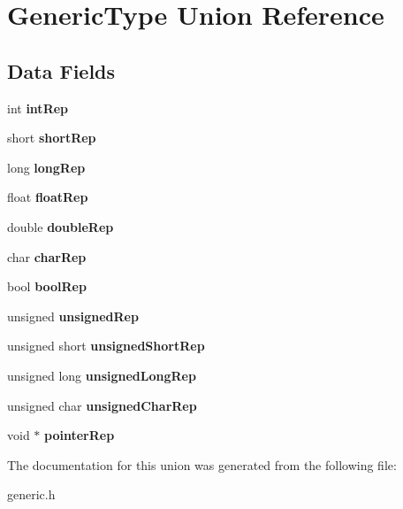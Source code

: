 \hypertarget{union_generic_type}{}\section{Generic\+Type Union Reference}
\label{union_generic_type}
\subsection*{Data Fields}
\begin{DoxyCompactItemize}
\item 
\hypertarget{union_generic_type_a89fd1c368975db376a6cdd770d587900}{}\label{union_generic_type_a89fd1c368975db376a6cdd770d587900} 
int {\bfseries int\+Rep}
\item 
\hypertarget{union_generic_type_ac950c4ff66d782e32b4e5cf8d6565fae}{}\label{union_generic_type_ac950c4ff66d782e32b4e5cf8d6565fae} 
short {\bfseries short\+Rep}
\item 
\hypertarget{union_generic_type_a29e82c715ea6fbe158eebca897716806}{}\label{union_generic_type_a29e82c715ea6fbe158eebca897716806} 
long {\bfseries long\+Rep}
\item 
\hypertarget{union_generic_type_aee93dd7c0fc502a552aacc321d5d5743}{}\label{union_generic_type_aee93dd7c0fc502a552aacc321d5d5743} 
float {\bfseries float\+Rep}
\item 
\hypertarget{union_generic_type_a5fe743464c3fec1fb7a724f06ba705b2}{}\label{union_generic_type_a5fe743464c3fec1fb7a724f06ba705b2} 
double {\bfseries double\+Rep}
\item 
\hypertarget{union_generic_type_a1eec0595c8a080d2ce3a1bf2b62895cb}{}\label{union_generic_type_a1eec0595c8a080d2ce3a1bf2b62895cb} 
char {\bfseries char\+Rep}
\item 
\hypertarget{union_generic_type_acd5d54743ad441d2d1012e2c7a993fae}{}\label{union_generic_type_acd5d54743ad441d2d1012e2c7a993fae} 
bool {\bfseries bool\+Rep}
\item 
\hypertarget{union_generic_type_abbcfccf03c9bffba7414cdb603005ccb}{}\label{union_generic_type_abbcfccf03c9bffba7414cdb603005ccb} 
unsigned {\bfseries unsigned\+Rep}
\item 
\hypertarget{union_generic_type_a3d009a0904447db8708adf3c1388868f}{}\label{union_generic_type_a3d009a0904447db8708adf3c1388868f} 
unsigned short {\bfseries unsigned\+Short\+Rep}
\item 
\hypertarget{union_generic_type_ad02395c0bbeb6b6cedba250d07a45b4a}{}\label{union_generic_type_ad02395c0bbeb6b6cedba250d07a45b4a} 
unsigned long {\bfseries unsigned\+Long\+Rep}
\item 
\hypertarget{union_generic_type_ac2ba0a1cd4cd985a8dad24aade09aec7}{}\label{union_generic_type_ac2ba0a1cd4cd985a8dad24aade09aec7} 
unsigned char {\bfseries unsigned\+Char\+Rep}
\item 
\hypertarget{union_generic_type_a76ac2fff68dd1a6fc1c1e35448e31fe3}{}\label{union_generic_type_a76ac2fff68dd1a6fc1c1e35448e31fe3} 
void $\ast$ {\bfseries pointer\+Rep}
\end{DoxyCompactItemize}


The documentation for this union was generated from the following file\+:\begin{DoxyCompactItemize}
\item 
generic.\+h\end{DoxyCompactItemize}
